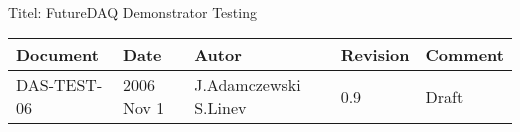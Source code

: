 \\Titel: FutureDAQ Demonstrator Testing
\begin{table}[h]
\begin{tabular}{|p{2.5cm}|p{2.0cm}|p{3.0cm}|p{1.6cm}|p{5.0cm}|} \hline
Document   & Date        & Autor       & Revision & Comment \\
\hline DAS-TEST-06 & 2006 Nov 1 & J.Adamczewski S.Linev & 0.9 &
Draft
\\ \hline
\end{tabular}
\end{table}
